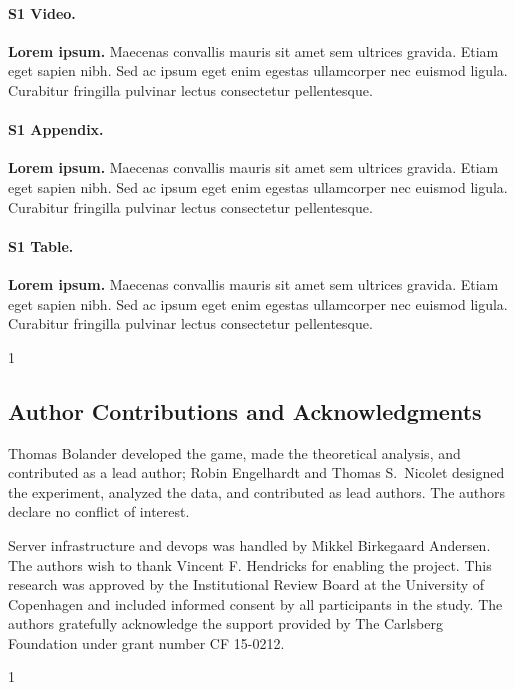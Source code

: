 \documentclass[10pt,letterpaper]{article}
\def\arxiv{0}
\begin{document}
\paragraph*{S1 Video.}
\label{S1_Video}
{\bf Lorem ipsum.}  Maecenas convallis mauris sit amet sem ultrices gravida. Etiam eget sapien nibh. Sed ac ipsum eget enim egestas ullamcorper nec euismod ligula. Curabitur fringilla pulvinar lectus consectetur pellentesque.

\paragraph*{S1 Appendix.}
\label{S1_Appendix}
{\bf Lorem ipsum.} Maecenas convallis mauris sit amet sem ultrices gravida. Etiam eget sapien nibh. Sed ac ipsum eget enim egestas ullamcorper nec euismod ligula. Curabitur fringilla pulvinar lectus consectetur pellentesque.

\paragraph*{S1 Table.}
\label{S1_Table}
{\bf Lorem ipsum.} Maecenas convallis mauris sit amet sem ultrices gravida. Etiam eget sapien nibh. Sed ac ipsum eget enim egestas ullamcorper nec euismod ligula. Curabitur fringilla pulvinar lectus consectetur pellentesque.
\fi


\if\arxiv 1
\begin{acknowledgments}
\else
\section*{Author Contributions and Acknowledgments}
\fi
Thomas Bolander developed the game, made the theoretical analysis, and contributed as a lead author; Robin Engelhardt and Thomas S.\ Nicolet designed the experiment, analyzed the data, and contributed as lead authors. The authors declare no conflict of interest.

Server infrastructure and devops was handled by Mikkel Birkegaard Andersen. The authors wish to thank Vincent F. Hendricks for enabling the project. This research was approved by the Institutional Review Board at the University of Copenhagen and included informed consent by all participants in the study. The authors gratefully acknowledge the support provided by The Carlsberg Foundation under grant number CF 15-0212.


\if\arxiv 1
\end{acknowledgments}
\fi
\end{document}
